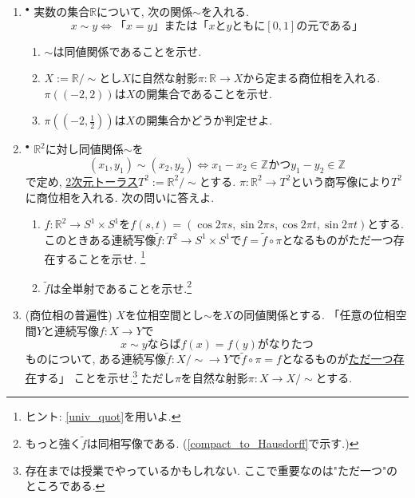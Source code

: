 \documentclass[dvipdfmx,a4paper,11pt]{article}
\newcommand{\R}{\mathbb{R}}
\newcommand{\Z}{\mathbb{Z}}
\theoremstyle{definition}
\begin{document}
\begin{enumerate}[ label=\textbf{問}\ref*{sec-quot}.\arabic*]
	\setlength{\parskip}{0cm} 
  \setlength{\itemsep}{7pt} 
\item $^\bullet$ 実数の集合$\R$について, 次の関係$\sim$を入れる.
	$$
	x \sim y \Leftrightarrow \text{「$x=y$」または「$x$と$y$ともに$[0,1]$の元である」} 
	$$	
\begin{enumerate}
	\setlength{\parskip}{0cm} 
  \setlength{\itemsep}{0pt} 
\item $\sim$は同値関係であることを示せ. 
\item $X := \R/\sim$とし$X$に自然な射影$\pi : \R \to X$から定まる商位相を入れる. 
$\pi\left( (-2,2) \right)$は$X$の開集合であることを示せ.
\item $\pi\left((-2,\frac{1}{2}) \right)$は$X$の開集合かどうか判定せよ. 
\end{enumerate}

\item$^{\bullet}$ \label{torus} $\R^{2}$に対し同値関係$\sim$を
$$
(x_1, y_1)\sim (x_2, y_2) \Leftrightarrow x_1 - x_2 \in \Z \text{かつ} y_1 - y_2 \in \Z 
$$
で定め, \underline{2次元トーラス}$T^2 := \R^2/\sim$とする.
$\pi : \R^2 \rightarrow T^2$という商写像により$T^2$に商位相を入れる.
次の問いに答えよ. %
\begin{enumerate}
 \setlength{\parskip}{0cm}
  \setlength{\itemsep}{0pt}
\item $f : \R^2 \rightarrow S^1 \times S^1$を$f(s,t) = (\cos 2 \pi s, \sin 2 \pi s,\cos 2 \pi t, \sin 2 \pi t)$とする. このときある連続写像$\widetilde{f}: T^2 \rightarrow S^1 \times S^1$で$f = \widetilde{f} \circ \pi $となるものがただ一つ存在することを示せ. \footnote{ヒント: \ref{univ_quot}を用いよ. }
	\item $\widetilde{f}$は全単射であることを示せ.\footnote{もっと強く$\widetilde{f}$は同相写像である. (\ref{compact_to_Hausdorff}で示す.)}  %
  \end{enumerate}
  
\item \label{univ_quot} (商位相の普遍性)
$X$を位相空間とし$\sim$を$X$の同値関係とする. 
「任意の位相空間$Y$と連続写像$f : X \to Y$で
$$
x \sim y \text{ならば} f(x)=f(y) \text{がなりたつ}
$$	
ものについて, ある連続写像$\widetilde{f} : X/\sim \to Y$で$\widetilde{f} \circ \pi =f$となるものが\underline{ただ一つ存在}する」 ことを示せ.\footnote{存在までは授業でやっているかもしれない. ここで重要なのは"ただ一つ"のところである. }
ただし$\pi$を自然な射影$\pi : X\to X/\sim $とする.




\end{enumerate}
\end{document}
